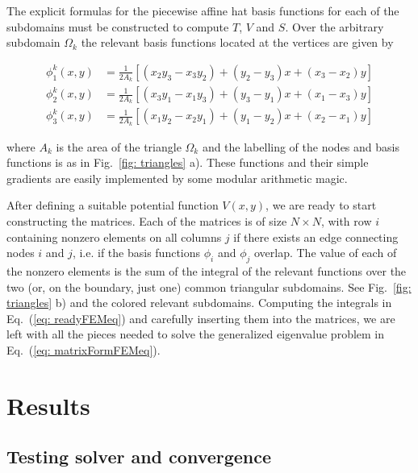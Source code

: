 \documentclass[a4paper,12pt]{article}
\begin{document}
The explicit formulas for the piecewise affine hat basis functions for each of the subdomains must be constructed to compute $T$, $V$ and $S$. Over the arbitrary subdomain $\Omega_k$ the relevant basis functions located at the vertices are given by

\begin{eqnarray}
\phi_1^k(x,y) &= \frac{1}{2A_k} \left[ (x_2y_3 - x_3y_2) + (y_2 - y_3)x + (x_3-x_2)y \right] \\
\phi_2^k(x,y) &= \frac{1}{2A_k} \left[ (x_3y_1 - x_1y_3) + (y_3 - y_1)x + (x_1-x_3)y  \right] \\
\phi_3^k(x,y) &= \frac{1}{2A_k} \left[ (x_1y_2 - x_2y_1) + (y_1 - y_2)x + (x_2-x_1)y \right]
\end{eqnarray}

where $A_k$ is the area of the triangle $\Omega_k$ and the labelling of the nodes and basis functions is as in Fig.~\ref{fig: triangles} a). These functions and their simple gradients are easily implemented by some modular arithmetic magic.

After defining a suitable potential function $V(x,y)$, we are ready to start constructing the matrices. Each of the matrices is of size $N \times N$, with row $i$ containing nonzero elements on all columns $j$ if there exists an edge connecting nodes $i$ and $j$, i.e. if the basis functions $\phi_i$ and $\phi_j$ overlap. The value of each of the nonzero elements is the sum of the integral of the relevant functions over the two (or, on the boundary, just one) common triangular subdomains. See Fig.~\ref{fig: triangles} b) and the colored relevant subdomains. Computing the integrals in Eq.~(\ref{eq: readyFEMeq}) and carefully inserting them into the matrices, we are left with all the pieces needed to solve the generalized eigenvalue problem in Eq.~(\ref{eq: matrixFormFEMeq}).

\section{Results}

\subsection{Testing solver and convergence}
\end{document}
